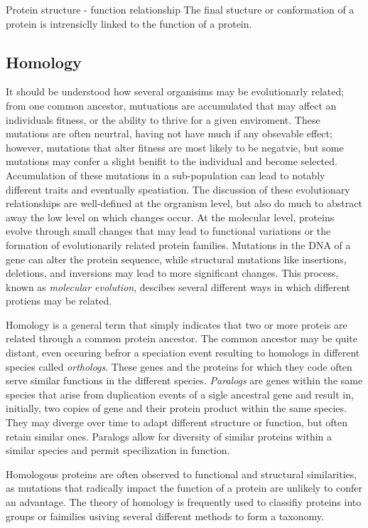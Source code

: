 Protein structure - function relationship
The final stucture or conformation of a protein is intrensiclly linked to the function of a protein.

\subsection{Homology}
It should be understood how several organisims may be evolutionarly related; from one common ancestor, mutuations are accumulated that may affect an individuals fitness, or the ability to thrive for a given enviroment.
These mutations are often neurtral, having not have much if any obsevable effect; however, mutations that alter fitness are most likely to be negatvie, but some mutations may confer a slight benifit to the individual and become selected. 
Accumulation of these mutations in a sub-population can lead to notably different traits and eventually speatiation. 
The discussion of these evolutionary relationships are well-defined at the orgranism level, but also do much to abstract away the low level on which changes occur. 
At the molecular level, proteins evolve through small changes that may lead to functional variations or the formation of evolutionarily related protein families. Mutations in the DNA of a gene can alter the protein sequence, while structural mutations like insertions, deletions, and inversions may lead to more significant changes. 
This process, known as \emph{molecular evolution}, descibes several different ways in which different protiens may be related. 

Homology is a general term that simply indicates that two or more proteis are related through a common protein ancestor. %
The common ancestor may be quite distant, even occuring befror a speciation event resulting to homologs in different species called \emph{orthologs}. These genes and the proteins for which they code often serve similar functions in the different species.
\emph{Paralogs} are genes within the same species that arise from duplication events of a sigle ancestral gene and result in, initially, two copies of gene and their protein product within the same species. They may diverge over time to adapt different structure or function, but often retain similar ones. Paralogs allow for diversity of similar proteins within a similar species and permit specilization in function.

Homologous proteins are often observed to functional and structural similarities, as mutations that radically impact the function of a protein are unlikely to confer an advantage. 
The theory of homology is frequently used to classifiy proteins into groups or faimilies usiving several different methods to form a taxonomy. 



